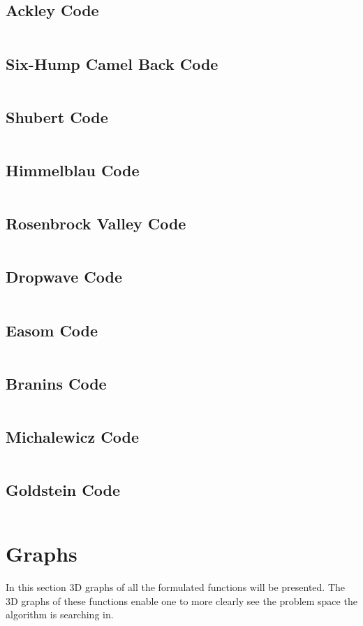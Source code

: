 \subsection{Ackley Code}
\inputminted[fontsize=\tiny]{python}{./Graphs/Ackley.py}
\subsection{Six-Hump Camel Back Code}
\inputminted[fontsize=\tiny]{python}{./Graphs/Camel.py}
\subsection{Shubert Code}
\inputminted[fontsize=\tiny]{python}{./Graphs/Shubert.py}
\subsection{Himmelblau Code}
\inputminted[fontsize=\tiny]{python}{./Graphs/Himmelblau.py}
\subsection{Rosenbrock Valley Code}
\inputminted[fontsize=\tiny]{python}{./Graphs/Rosenbrock.py}
\subsection{Dropwave Code}
\inputminted[fontsize=\tiny]{python}{./Graphs/Dropwave.py}
\subsection{Easom Code}
\inputminted[fontsize=\tiny]{python}{./Graphs/Easom.py}
\subsection{Branins Code}
\inputminted[fontsize=\tiny]{python}{./Graphs/Branin.py}
\subsection{Michalewicz Code}
\inputminted[fontsize=\tiny]{python}{./Graphs/Michalewicz.py}
\subsection{Goldstein Code}
\inputminted[fontsize=\tiny]{python}{./Graphs/Goldstein.py}
\section{Graphs}
In this section 3D graphs of all the formulated functions will be presented. The 3D graphs of these functions enable one to more clearly see the problem space the algorithm is searching in.

